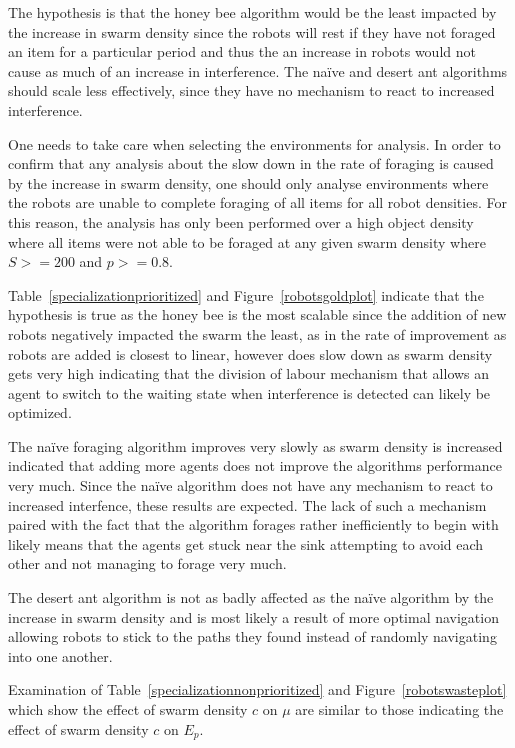 The hypothesis is that the honey bee algorithm would be the least impacted by the increase in swarm density since the robots will rest if they have not foraged an item for a particular period and thus the an increase in robots would not cause as much of an increase in interference. The na\"ive and desert ant algorithms should scale less effectively, since they have no mechanism to react to increased interference.

One needs to take care when selecting the environments for analysis. In order to confirm that any analysis about the slow down in the rate of foraging is caused by the increase in swarm density, one should only analyse environments where the robots are unable to complete foraging of all items for all robot densities. For this reason, the analysis has only been performed over a high object density where all items were not able to be foraged at any given swarm density where $S >= 200$ and $p >= 0.8$. %

Table~\ref{specializationprioritized} and Figure~\ref{robotsgoldplot} indicate that the hypothesis is true as the honey bee is the most scalable since the addition of new robots negatively impacted the swarm the least, as in the rate of improvement as robots are added is closest to linear, however does slow down as swarm density gets very high indicating that the division of labour mechanism that allows an agent to switch to the waiting state when interference is detected can likely be optimized. 

The na\"ive foraging algorithm improves very slowly as swarm density is increased indicated that adding more agents does not improve the algorithms performance very much. Since the na\"ive algorithm does not have any mechanism to react to increased interfence, these results are expected. The lack of such a mechanism paired with the fact that the algorithm forages rather inefficiently to begin with likely means that the agents get stuck near the sink attempting to avoid each other and not managing to forage very much.

The desert ant algorithm is not as badly affected as the na\"ive algorithm by the increase in swarm density and is most likely a result of more optimal navigation allowing robots to stick to the paths they found instead of randomly navigating into one another. 

Examination of Table~\ref{specializationnonprioritized} and Figure~\ref{robotswasteplot} which show the effect of swarm density $c$ on $\mu$ are similar to those indicating the effect of swarm density $c$ on $E_p$.


